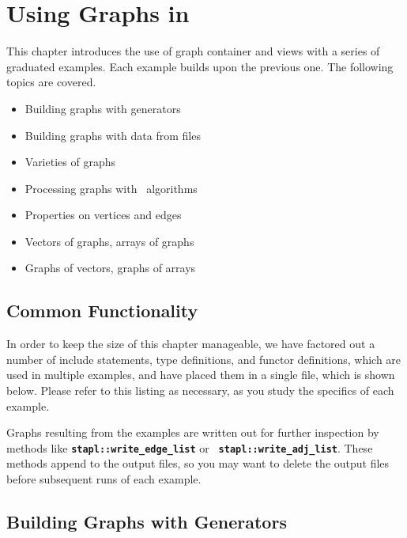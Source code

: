 \documentclass{report}
\begin{document}

\chapter{Using Graphs in \stapl\ }

This chapter introduces the use of graph container and views
with a series of graduated examples.
Each example builds upon the previous one.
The following topics are covered.

\begin{itemize}
\item
Building graphs with generators
\item
Building graphs with data from files
\item
Varieties of graphs
\item
Processing graphs with \stapl\ algorithms
\item
Properties on vertices and edges
\item
Vectors of graphs, arrays of graphs
\item
Graphs of vectors, graphs of arrays
\end{itemize}

\section{Common Functionality}

In order to keep the size of this chapter manageable, we have factored
out a number of include statements, type definitions, and functor
definitions, which are used in multiple examples, and have placed them
in a single file, which is shown below.  Please refer to this listing
as necessary, as you study the specifics of each example.



Graphs resulting from the examples are written out for further inspection by
methods like \texttt{{\bf stapl::write\_edge\_list}} or \texttt{{\bf
stapl::write\_adj\_list}}. These methods append to the output files, so you may
want to delete the output files before subsequent runs of each example. 


\pagebreak
\section{Building Graphs with Generators}
\end{document}

